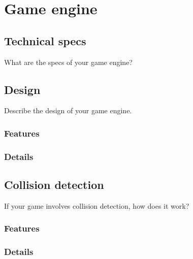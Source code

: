\section{Game engine} %
\subsection{Technical specs} %
What are the specs of your game engine?

\subsection{Design} %
Describe the design of your game engine.
\subsubsection{Features} %

\subsubsection{Details} %

\subsection{Collision detection} %
If your game involves collision detection, how does it work?
\subsubsection{Features} %

\subsubsection{Details} %